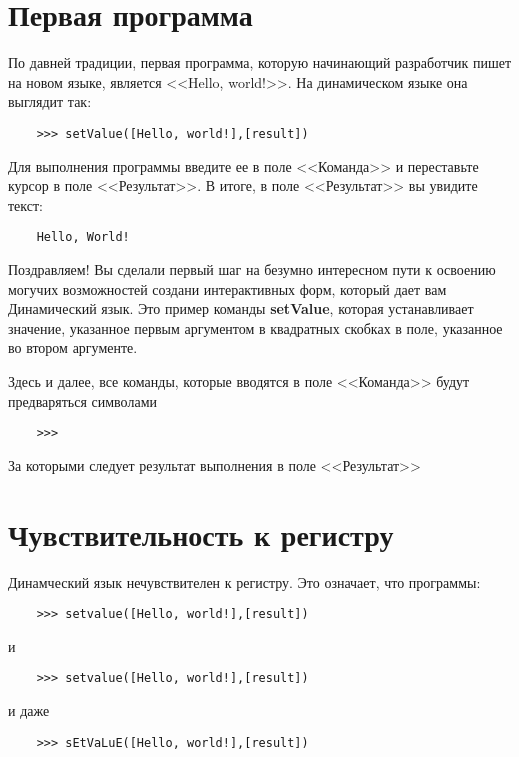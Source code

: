 \documentclass[10pt]{book}
\begin{document}
	\section{Первая программа}
	
	По давней традиции, первая программа, которую начинающий разработчик пишет на новом языке, является <<Hello, world!>>. На динамическом языке она выглядит так:
	\begin{verbatim}
	>>> setValue([Hello, world!],[result])
	\end{verbatim}
	
	Для выполнения программы введите ее в поле <<Команда>> и переставьте курсор в поле <<Результат>>. В итоге, в поле <<Результат>> вы увидите текст:
	
	\begin{verbatim}
	Hello, World!
	\end{verbatim}
	
	Поздравляем! Вы сделали первый шаг на безумно интересном пути к освоению могучих возможностей создани интерактивных форм, который дает вам Динамический язык.
	Это пример команды {\bf setValue}, которая устанавливает значение, указанное первым аргументом в квадратных скобках в поле, указанное во втором аргументе.
	
	Здесь и далее, все команды, которые вводятся в поле <<Команда>> будут предваряться символами 	\begin{verbatim}
	>>>
	\end{verbatim}	За которыми следует результат выполнения в поле <<Результат>>
	
	\section{Чувствительность к регистру}
	
	Динамческий язык нечувствителен к регистру. Это означает, что программы:
	
	\begin{verbatim}
	>>> setvalue([Hello, world!],[result])
	\end{verbatim}
	
	и
	
	\begin{verbatim}
	>>> setvalue([Hello, world!],[result])
	\end{verbatim}
	
	и даже
	
	\begin{verbatim}
	>>> sEtVaLuE([Hello, world!],[result])
	\end{verbatim}
	
\end{document}
